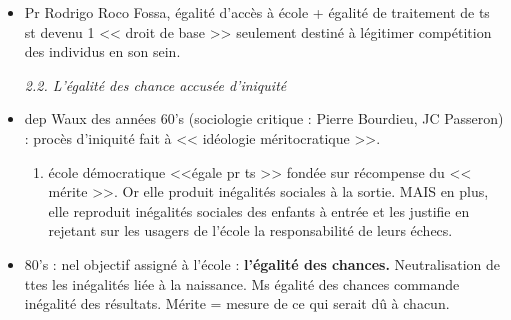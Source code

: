 \documentclass[12pt]{article}
\begin{document}
\begin{itemize}
\item Pr Rodrigo Roco Fossa, égalité d'accès à école + égalité de traitement de ts st devenu 1 << droit de base >> seulement destiné à légitimer compétition des individus en son sein.\\


\vspace{0.5cm}

\textit{2.2. L'égalité des chance accusée d'iniquité} \\

\item dep Waux des années 60's (sociologie critique : Pierre Bourdieu, JC Passeron) : procès d'iniquité fait à << idéologie méritocratique >>.
\begin{enumerate}
\item école démocratique <<égale pr ts >> fondée sur récompense du << mérite >>.  Or elle produit inégalités sociales à la sortie. MAIS en plus, elle reproduit inégalités sociales des enfants à entrée et les justifie en rejetant sur les usagers de l'école la responsabilité de leurs échecs.\\
\end{enumerate}

\item 80's : nel objectif assigné à l'école : \textbf{l'égalité des chances.} Neutralisation de ttes les inégalités liée à la naissance. Ms égalité des chances commande inégalité des résultats. Mérite = mesure de ce qui serait dû à chacun.\\


\end{itemize}
\end{document}
